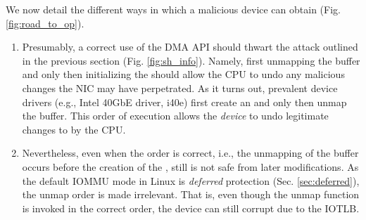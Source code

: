 We now detail the different ways in which a malicious device can obtain \oportunity{} (Fig. \ref{fig:road_to_op}).

\begin{enumerate}[label=(\roman*),wide, labelwidth=!, labelindent=0pt]

\item Presumably, a correct use of the DMA API should thwart the attack outlined in the previous section (Fig. \ref{fig:sh_info}). Namely, first unmapping the buffer and only then initializing the \shinfo{} should allow the CPU to undo any malicious changes the NIC may have perpetrated. 
As it turns out, prevalent device drivers (e.g., Intel 40GbE driver, i40e) first create an \skb{} and only then unmap the buffer. This order of execution allows the \emph{device} to undo legitimate changes to \shinfo{} by the CPU. 

\item Nevertheless, even when the order is correct, i.e., the unmapping of the buffer occurs before the creation of the \skb{}, still \shinfo{} is not safe from later modifications. As the default IOMMU mode in Linux is \emph{deferred} protection (Sec. \ref{sec:deferred}), the unmap order is made irrelevant. That is, even though the unmap function is invoked in the correct order, the device can still corrupt \shinfo{} due to the IOTLB.  


\end{enumerate}

